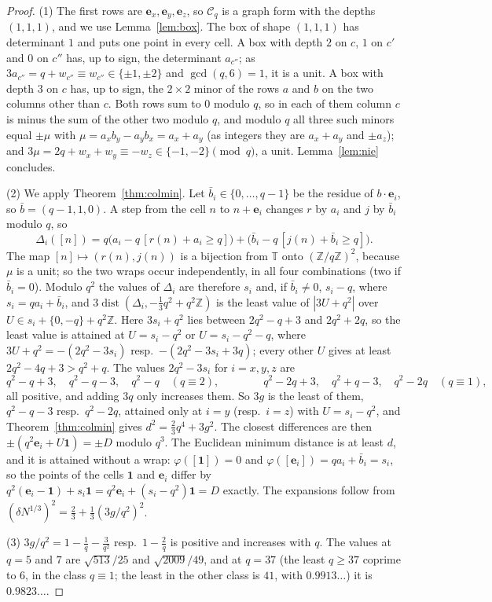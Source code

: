 \documentclass[11pt]{amsart}
\theoremstyle{definition}
\theoremstyle{plain}
\newcommand{\Z}{\mathbb{Z}}
\newcommand{\e}{\mathbf{e}}
\begin{document}
\begin{proof}
(1) The first rows are $\e_x,\e_y,\e_z$, so $\mathcal C_q$ is a graph form with the depths $(1,1,1)$, and we use Lemma~\ref{lem:box}. The box of shape $(1,1,1)$ has determinant $1$ and puts one point in every cell. A box with depth $2$ on $c$, $1$ on $c'$ and $0$ on $c''$ has, up to sign, the determinant $a_{c''}$; as $3a_{c''}=q+w_{c''}\equiv w_{c''}\in\{\pm1,\pm2\}$ and $\gcd(q,6)=1$, it is a unit. A box with depth $3$ on $c$ has, up to sign, the $2\times2$ minor of the rows $a$ and $b$ on the two columns other than $c$. Both rows sum to $0$ modulo $q$, so in each of them column $c$ is minus the sum of the other two modulo $q$, and modulo $q$ all three such minors equal $\pm\mu$ with $\mu=a_xb_y-a_yb_x=a_x+a_y$ (as integers they are $a_x+a_y$ and $\pm a_z$); and $3\mu=2q+w_x+w_y\equiv-w_z\in\{-1,-2\}\pmod q$, a unit. Lemma~\ref{lem:nie} concludes.

(2) We apply Theorem~\ref{thm:colmin}. Let $\bar b_i\in\{0,\dots,q-1\}$ be the residue of $b\cdot\e_i$, so $\bar b=(q-1,1,0)$. A step from the cell $n$ to $n+\e_i$ changes $r$ by $a_i$ and $j$ by $\bar b_i$ modulo $q$, so
\[
\Delta_i([n])=q\bigl(a_i-q\,[r(n)+a_i\ge q]\bigr)+\bigl(\bar b_i-q\,[j(n)+\bar b_i\ge q]\bigr).
\]
The map $[n]\mapsto(r(n),j(n))$ is a bijection from $\mathbb T$ onto $(\Z/q\Z)^2$, because $\mu$ is a unit; so the two wraps occur independently, in all four combinations (two if $\bar b_i=0$). Modulo $q^2$ the values of $\Delta_i$ are therefore $s_i$ and, if $\bar b_i\ne0$, $s_i-q$, where $s_i=qa_i+\bar b_i$, and $3\operatorname{dist}(\Delta_i,-\frac13q^2+q^2\Z)$ is the least value of $|3U+q^2|$ over $U\in s_i+\{0,-q\}+q^2\Z$. Here $3s_i+q^2$ lies between $2q^2-q+3$ and $2q^2+2q$, so the least value is attained at $U=s_i-q^2$ or $U=s_i-q^2-q$, where $3U+q^2=-(2q^2-3s_i)$ resp.\ $-(2q^2-3s_i+3q)$; every other $U$ gives at least $2q^2-4q+3>q^2+q$. The values $2q^2-3s_i$ for $i=x,y,z$ are
\[
q^2-q+3,\quad q^2-q-3,\quad q^2-q\quad(q\equiv2),\qquad\qquad q^2-2q+3,\quad q^2+q-3,\quad q^2-2q\quad(q\equiv1),
\]
all positive, and adding $3q$ only increases them. So $3g$ is the least of them, $q^2-q-3$ resp.\ $q^2-2q$, attained only at $i=y$ (resp.\ $i=z$) with $U=s_i-q^2$, and Theorem~\ref{thm:colmin} gives $d^2=\frac23q^4+3g^2$. The closest differences are then $\pm(q^2\e_i+U\mathbf 1)=\pm D$ modulo $q^3$. The Euclidean minimum distance is at least $d$, and it is attained without a wrap: $\varphi([\mathbf 1])=0$ and $\varphi([\e_i])=qa_i+\bar b_i=s_i$, so the points of the cells $\mathbf 1$ and $\e_i$ differ by $q^2(\e_i-\mathbf 1)+s_i\mathbf 1=q^2\e_i+(s_i-q^2)\mathbf 1=D$ exactly. The expansions follow from $(\delta N^{1/3})^2=\frac23+\frac13(3g/q^2)^2$.

(3) $3g/q^2=1-\frac1q-\frac3{q^2}$ resp.\ $1-\frac2q$ is positive and increases with $q$. The values at $q=5$ and $7$ are $\sqrt{513}/25$ and $\sqrt{2009}/49$, and at $q=37$ (the least $q\ge37$ coprime to $6$, in the class $q\equiv1$; the least in the other class is $41$, with $0.9913\ldots$) it is $0.9823\ldots$.
\end{proof}
\end{document}
